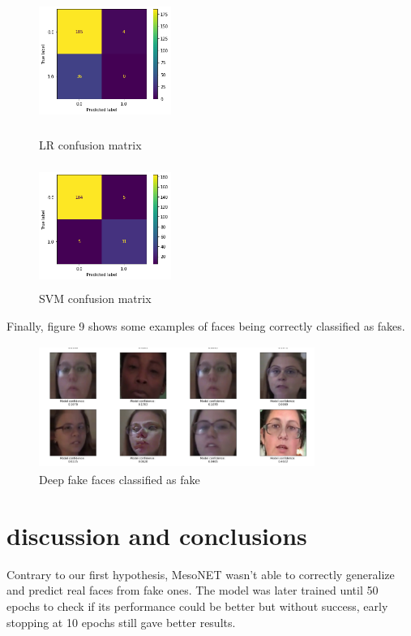 \documentclass{bmvc2k}
\begin{document}
\begin{figure}[!h]
  \centering
  \begin{minipage}[b]{0.4\textwidth}
    \includegraphics[width=4.3cm, height=4cm]{Figs/lr-confusion-matrix.png}
    \caption{LR confusion matrix}
  \end{minipage}
  \hfill
  \begin{minipage}[b]{0.4\textwidth}
    \includegraphics[width=4.3cm, height=4cm]{Figs/svm-confusion-matrix.png}
    \caption{SVM confusion matrix}
  \end{minipage}
\end{figure}

Finally, figure 9 shows some examples of faces being correctly classified as fakes.

\begin{figure}[!h]
\centering
\includegraphics[width=9cm, height=4cm]{Figs/results.png}
    \caption{Deep fake faces classified as fake}
\end{figure}

\section{discussion and conclusions}

Contrary to our first hypothesis, MesoNET wasn't able to correctly generalize and predict real faces from fake ones. The model was later trained until 50 epochs to check if its performance could be better but without success, early stopping at 10 epochs still gave better results.
\end{document}

